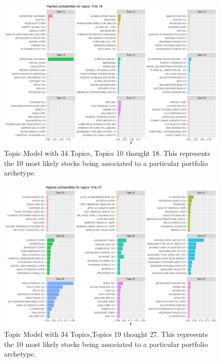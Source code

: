 \begin{figure}
	\centering
	\includegraphics[width=1\linewidth]{Figures/ChapterV/LDA34_10_18}
	\caption[Topic Model with 34 Topics, Topics 10 thought 18]{Topic Model with 34 Topics, Topics 10 thought 18. This represents the 10 most likely stocks being associated to a particular portfolio archetype.}
	\label{fig:lda341018}
\end{figure}
	
	
\begin{figure}
	\centering
	\includegraphics[width=1\linewidth]{Figures/ChapterV/LDA34_19_27}
	\caption[Topic Model with 34 Topics, Topics 19 thought 27]{Topic Model with 34 Topics,Topics 19 thought 27. This represents the 10 most likely stocks being associated to a particular portfolio archetype.}
	\label{fig:lda341927}
\end{figure}
	
